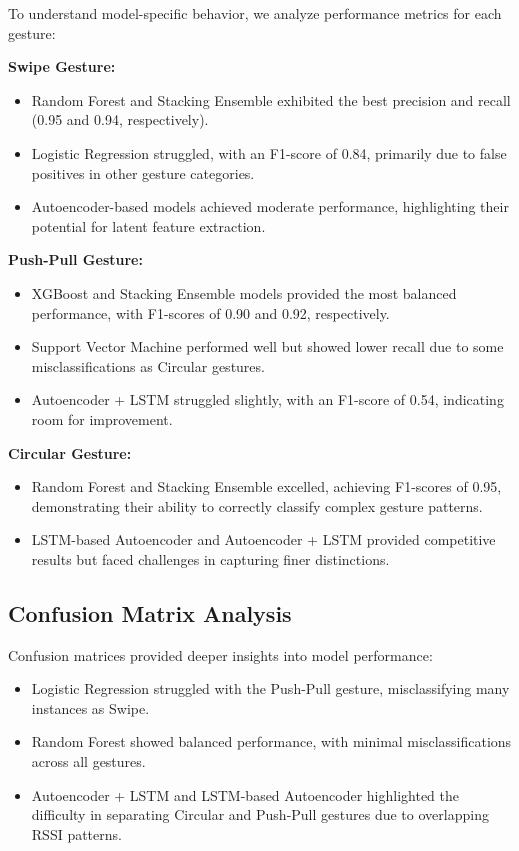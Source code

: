 \documentclass[10pt,twocolumn,letterpaper]{article}
\begin{document}
To understand model-specific behavior, we analyze performance metrics for each gesture:

\textbf{Swipe Gesture:}
\begin{itemize}
  \item Random Forest and Stacking Ensemble exhibited the best precision and recall (0.95 and 0.94, respectively).
  \item Logistic Regression struggled, with an F1-score of 0.84, primarily due to false positives in other gesture categories.
  \item Autoencoder-based models achieved moderate performance, highlighting their potential for latent feature extraction.
\end{itemize}

\textbf{Push-Pull Gesture:}
\begin{itemize}
  \item XGBoost and Stacking Ensemble models provided the most balanced performance, with F1-scores of 0.90 and 0.92, respectively.
  \item Support Vector Machine performed well but showed lower recall due to some misclassifications as Circular gestures.
  \item Autoencoder + LSTM struggled slightly, with an F1-score of 0.54, indicating room for improvement.
\end{itemize}

\textbf{Circular Gesture:}
\begin{itemize}
  \item Random Forest and Stacking Ensemble excelled, achieving F1-scores of 0.95, demonstrating their ability to correctly classify complex gesture patterns.
  \item LSTM-based Autoencoder and Autoencoder + LSTM provided competitive results but faced challenges in capturing finer distinctions.
\end{itemize}

\subsection{Confusion Matrix Analysis}

Confusion matrices provided deeper insights into model performance:
\begin{itemize}
  \item Logistic Regression struggled with the Push-Pull gesture, misclassifying many instances as Swipe.
  \item Random Forest showed balanced performance, with minimal misclassifications across all gestures.
  \item Autoencoder + LSTM and LSTM-based Autoencoder highlighted the difficulty in separating Circular and Push-Pull gestures due to overlapping RSSI patterns.
\end{itemize}
\end{document}
